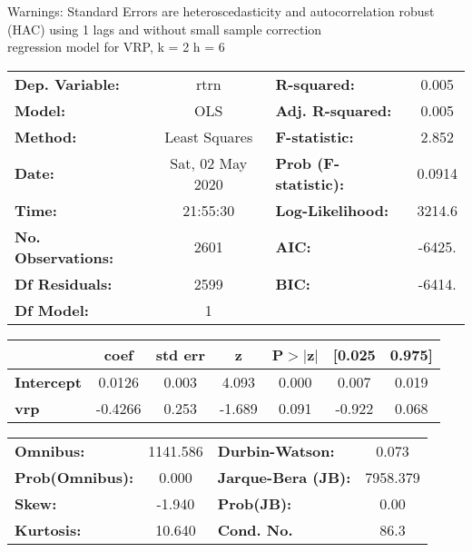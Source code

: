 Warnings: \newline
 [1] Standard Errors are heteroscedasticity and autocorrelation robust (HAC) using 1 lags and without small sample correction\\ 

regression model for VRP, k = 2 h = 6\begin{center}
\begin{tabular}{lclc}
\toprule
\textbf{Dep. Variable:}    &       rtrn       & \textbf{  R-squared:         } &     0.005   \\
\textbf{Model:}            &       OLS        & \textbf{  Adj. R-squared:    } &     0.005   \\
\textbf{Method:}           &  Least Squares   & \textbf{  F-statistic:       } &     2.852   \\
\textbf{Date:}             & Sat, 02 May 2020 & \textbf{  Prob (F-statistic):} &   0.0914    \\
\textbf{Time:}             &     21:55:30     & \textbf{  Log-Likelihood:    } &    3214.6   \\
\textbf{No. Observations:} &        2601      & \textbf{  AIC:               } &    -6425.   \\
\textbf{Df Residuals:}     &        2599      & \textbf{  BIC:               } &    -6414.   \\
\textbf{Df Model:}         &           1      & \textbf{                     } &             \\
\bottomrule
\end{tabular}
\begin{tabular}{lcccccc}
                   & \textbf{coef} & \textbf{std err} & \textbf{z} & \textbf{P$> |$z$|$} & \textbf{[0.025} & \textbf{0.975]}  \\
\midrule
\textbf{Intercept} &       0.0126  &        0.003     &     4.093  &         0.000        &        0.007    &        0.019     \\
\textbf{vrp}       &      -0.4266  &        0.253     &    -1.689  &         0.091        &       -0.922    &        0.068     \\
\bottomrule
\end{tabular}
\begin{tabular}{lclc}
\textbf{Omnibus:}       & 1141.586 & \textbf{  Durbin-Watson:     } &    0.073  \\
\textbf{Prob(Omnibus):} &   0.000  & \textbf{  Jarque-Bera (JB):  } & 7958.379  \\
\textbf{Skew:}          &  -1.940  & \textbf{  Prob(JB):          } &     0.00  \\
\textbf{Kurtosis:}      &  10.640  & \textbf{  Cond. No.          } &     86.3  \\
\bottomrule
\end{tabular}
\end{center}

